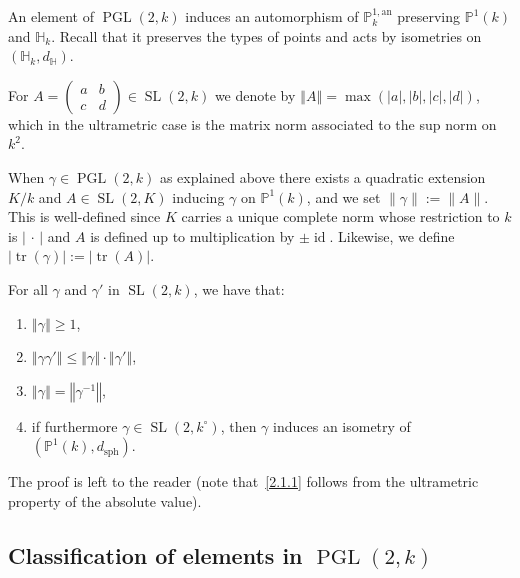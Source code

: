 \documentclass[AHL,Unicode,longabstracts]{cedram}
\DeclareMathOperator{\tr}{tr}
\DeclareMathOperator{\id}{id}
\DeclareMathOperator{\sph}{sph}
\DeclareMathOperator{\SL}{SL}
\DeclareMathOperator{\PGL}{PGL}
\newcommand{\hh}{\mathbb{H}}
\newcommand{\norm}[1]{\left\Vert#1\right\Vert}
\newcommand{\abs}[1]{\left\vert#1\right\vert}
\newcommand{\pu}{{\mathbb{P}^1}}
\newcommand{\PP}{\mathbb{P}}
\newcommand{\berk}{{\mathbb{P}^{1, \mathrm{an}}_k}}
\newcommand{\lrpar}[1]{\left(#1\right)}
\newcommand{\SLk}{\SL(2,k)}
\newcommand{\PGLk}{\PGL(2, k)}
\newcommand{\inv}{^{-1}}
\newcommand*{\romanenumi}{\renewcommand*{\theenumi}{\roman{enumi}}}
\begin{document}
An element of $\PGLk$ induces an automorphism of $\berk$ preserving $\pu(k)$ and $\hh_k$. Recall that it preserves the types of points and acts by isometries on $(\hh_k,d_\hh)$.

For $A = \lrpar{\begin{smallmatrix} a & b \\ c & d
\end{smallmatrix}} \in \SLk$ we denote by
$\norm{A} = \max\lrpar{\abs{a}, \abs{b}, \abs{c}, \abs{d}}$, which in the ultrametric case is the matrix norm associated to the sup norm on $ k^2$.

When $\gamma \in \PGL(2,k)$ as explained above there exists a quadratic extension $K/k$ and $A \in \SL(2,K)$ inducing $\gamma$ on $\PP^1(k)$, and we set $\| \gamma \| := \| A\|$. This is well-defined since $K$ carries a unique complete norm whose restriction to $k$ is $|{\,\cdot\,}|$ and $A$ is defined up to multiplication by $\pm \id$. Likewise, we define $\abs{\tr(\gamma)} := \abs{\tr(A)}$.

\begin{prop}
For all $\gamma$ and $\gamma' $ in $\SLk$, we have that:
\begin{enumerate}%
\item \label{2.1.1} $\norm{\gamma}\geq 1$,
\item \label{2.1.2} $\norm{\gamma \gamma'}\leq \norm{\gamma}\cdot\norm{\gamma'}$,
\item \label{2.1.3} $\norm{\gamma} = \norm{\gamma\inv}$,
\item \label{2.1.4} if furthermore $\gamma\in \SL(2,k^\circ)$, then $\gamma$ induces an isometry of $(\PP^1(k),d_{\sph})$.
\end{enumerate}
\end{prop}

The proof is left to the reader (note that~\eqref{2.1.1} follows from the ultrametric property of the absolute value).


\subsection{Classification of elements in \texorpdfstring{$\PGL(2,k)$}{PGL(2,k)}}
\end{document}
